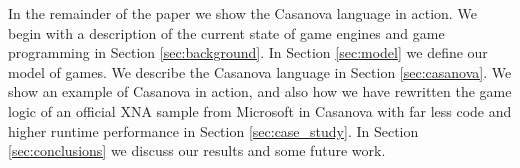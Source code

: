 In the remainder of the paper we show the Casanova language in action. We begin with a description of the current state of game engines and game programming in Section \ref{sec:background}. In Section \ref{sec:model} we define our model of games. We describe the Casanova language in Section \ref{sec:casanova}.  We show an example of Casanova in action, and also how we have rewritten the game logic of an official XNA sample from Microsoft \cite{XNA_SAMPLES} in Casanova with far less code and higher runtime performance in Section \ref{sec:case_study}. In Section \ref{sec:conclusions} we discuss our results and some future work.
